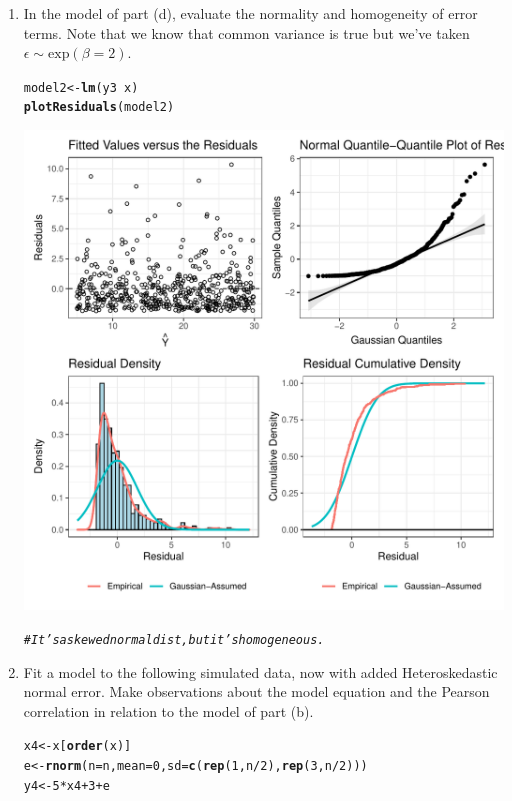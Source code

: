 \documentclass{article}\usepackage[]{graphicx}\usepackage[]{color}
\makeatletter
\def\maxwidth{ %
  \ifdim\Gin@nat@width>\linewidth
    \linewidth
  \else
    \Gin@nat@width
  \fi
}
\newcommand{\hlnum}[1]{\textcolor[rgb]{0.686,0.059,0.569}{#1}}%
\newcommand{\hlcom}[1]{\textcolor[rgb]{0.678,0.584,0.686}{\textit{#1}}}%
\newcommand{\hlopt}[1]{\textcolor[rgb]{0,0,0}{#1}}%
\newcommand{\hlstd}[1]{\textcolor[rgb]{0.345,0.345,0.345}{#1}}%
\newcommand{\hlkwb}[1]{\textcolor[rgb]{0.69,0.353,0.396}{#1}}%
\newcommand{\hlkwc}[1]{\textcolor[rgb]{0.333,0.667,0.333}{#1}}%
\newcommand{\hlkwd}[1]{\textcolor[rgb]{0.737,0.353,0.396}{\textbf{#1}}}%
\newenvironment{kframe}{%
 \def\at@end@of@kframe{}%
 \ifinner\ifhmode%
  \def\at@end@of@kframe{\end{minipage}}%
  \begin{minipage}{\columnwidth}%
 \fi\fi%
 \def\FrameCommand##1{\hskip\@totalleftmargin \hskip-\fboxsep
 \colorbox{shadecolor}{##1}\hskip-\fboxsep
     \hskip-\linewidth \hskip-\@totalleftmargin \hskip\columnwidth}%
 \MakeFramed {\advance\hsize-\width
   \@totalleftmargin\z@ \linewidth\hsize
   \@setminipage}}%
 {\par\unskip\endMakeFramed%
 \at@end@of@kframe}
\newenvironment{knitrout}{}{} %
\makeatother
\begin{document}
\begin{enumerate}
\begin{enumerate}
  \item In the model of part (d), evaluate the normality and homogeneity of error 
  terms. Note that we know that common variance is true but we've taken $\epsilon \sim 
  \textrm{exp}(\beta=2)$.
\begin{knitrout}
\color{fgcolor}\begin{kframe}
\begin{alltt}
\hlstd{model2} \hlkwb{<-} \hlkwd{lm}\hlstd{(y3}\hlopt{~}\hlstd{x)}
\hlkwd{plotResiduals}\hlstd{(model2)}
\end{alltt}
\end{kframe}
\includegraphics[width=\maxwidth]{figure/unnamed-chunk-17-1} 
\begin{kframe}\begin{alltt}
\hlcom{#It's a skewed normal dist, but it's homogeneous.}
\end{alltt}
\end{kframe}
\end{knitrout}
\item Fit a model to the following simulated data, now with added Heteroskedastic
normal error. Make observations about the model equation and the Pearson correlation
in relation to the model of part (b).
\begin{knitrout}
\color{fgcolor}\begin{kframe}
\begin{alltt}
\hlstd{x4}\hlkwb{<-}\hlstd{x[}\hlkwd{order}\hlstd{(x)]}
\hlstd{e}\hlkwb{<-}\hlkwd{rnorm}\hlstd{(}\hlkwc{n}\hlstd{=n,}\hlkwc{mean}\hlstd{=}\hlnum{0}\hlstd{,}\hlkwc{sd}\hlstd{=}\hlkwd{c}\hlstd{(}\hlkwd{rep}\hlstd{(}\hlnum{1}\hlstd{,n}\hlopt{/}\hlnum{2}\hlstd{),}\hlkwd{rep}\hlstd{(}\hlnum{3}\hlstd{,n}\hlopt{/}\hlnum{2}\hlstd{)))}
\hlstd{y4}\hlkwb{<-}\hlnum{5}\hlopt{*}\hlstd{x4} \hlopt{+} \hlnum{3} \hlopt{+} \hlstd{e}


\end{alltt}
\end{kframe}
\end{knitrout}
\end{enumerate}
\end{enumerate}
\end{document}
